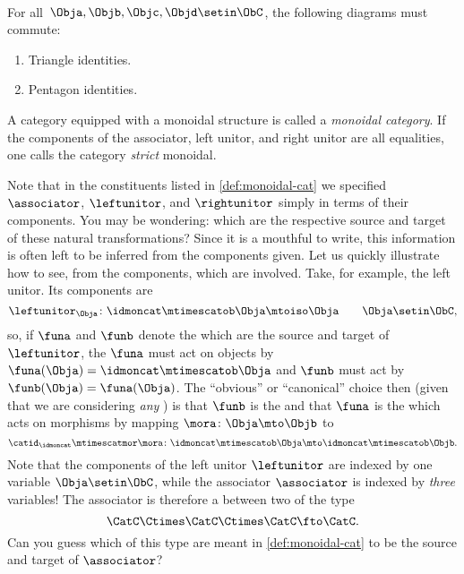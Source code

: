 \begin{ctdefinition}
    \condit\\
    For all~$\Obja,\Objb,\Objc,\Objd\setin \ObC$, the following diagrams must commute:
    \begin{enumerate}
        \item Triangle identities.
        \item Pentagon identities.
    \end{enumerate}
    A category equipped with a monoidal structure is called a \emph{monoidal category}.
    If the components of the associator, left unitor, and right unitor are all equalities, one calls the category \emph{strict} monoidal.
\end{ctdefinition}

\begin{remark}
    Note that in the constituents listed in \cref{def:monoidal-cat} we specified  $\associator$, $\leftunitor$, and $\rightunitor$ simply in terms of their components.
    You may be wondering: which  are the respective source and target of these natural transformations?
    Since it is a mouthful to write, this information is often left to be inferred from the components given.
    Let us quickly illustrate how to see, from the components, which  are involved.
    Take, for example, the left unitor.
    Its components are
    \begin{equation}
        \leftunitor_\Obja \colon \idmoncat\mtimescatob \Obja \mtoiso \Obja \quad \quad \Obja\setin \ObC,
    \end{equation}
    so, if $\funa$ and $\funb$ denote the  which are the source and target of $\leftunitor$, the  $\funa$ must act on objects by $\funa(\Obja) = \idmoncat \mtimescatob \Obja$ and $\funb$ must act by $\funb(\Obja) = \funa(\Obja)$.
    The ``obvious'' or ``canonical'' choice then (given that we are considering \emph{any} ) is that $\funb$ is the  and that $\funa$ is the  which acts on morphisms by mapping $\mora \colon \Obja \mto \Objb$ to
    \begin{equation}
        \catid_\idmoncat \mtimescatmor \mora \colon \idmoncat\mtimescatob \Obja \mto \idmoncat\mtimescatob \Objb.
    \end{equation}
    Note that the components of the left unitor $\leftunitor$ are indexed by one variable $\Obja \setin \ObC$, while the associator $\associator$ is indexed by \emph{three} variables!
    The associator is therefore a  between two  of the type
    \begin{equation}
        \CatC \Ctimes \CatC \Ctimes \CatC \fto \CatC.
    \end{equation}
    Can you guess which  of this type are meant in \cref{def:monoidal-cat} to be the source and target of $\associator$?
\end{remark}

